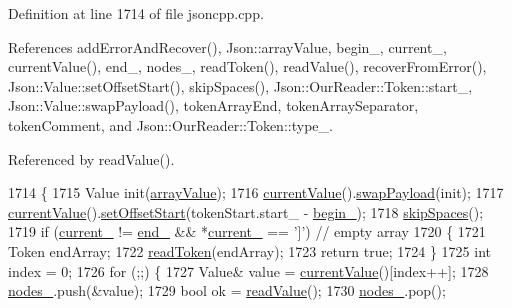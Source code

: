 Definition at line 1714 of file jsoncpp.\+cpp.



References add\+Error\+And\+Recover(), Json\+::array\+Value, begin\+\_\+, current\+\_\+, current\+Value(), end\+\_\+, nodes\+\_\+, read\+Token(), read\+Value(), recover\+From\+Error(), Json\+::\+Value\+::set\+Offset\+Start(), skip\+Spaces(), Json\+::\+Our\+Reader\+::\+Token\+::start\+\_\+, Json\+::\+Value\+::swap\+Payload(), token\+Array\+End, token\+Array\+Separator, token\+Comment, and Json\+::\+Our\+Reader\+::\+Token\+::type\+\_\+.



Referenced by read\+Value().


\begin{DoxyCode}
1714                                            \{
1715   Value init(\hyperlink{namespace_json_a7d654b75c16a57007925868e38212b4eadc8f264f36b55b063c78126b335415f4}{arrayValue});
1716   \hyperlink{class_json_1_1_our_reader_a2acd5b1d53e7d7e17c21ff8e96edc09d}{currentValue}().\hyperlink{class_json_1_1_value_a5263476047f20e2fc6de470e4de34fe5}{swapPayload}(init);
1717   \hyperlink{class_json_1_1_our_reader_a2acd5b1d53e7d7e17c21ff8e96edc09d}{currentValue}().\hyperlink{class_json_1_1_value_a92e32ea0f4f8a15853a3cf0beac9feb9}{setOffsetStart}(tokenStart.start\_ - 
      \hyperlink{class_json_1_1_our_reader_a9bda9d72335d52cd06e65f9eca3f70f5}{begin\_});
1718   \hyperlink{class_json_1_1_our_reader_a6fbc6d58a4505e5ccadf330b57b17ca5}{skipSpaces}();
1719   \textcolor{keywordflow}{if} (\hyperlink{class_json_1_1_our_reader_a5211fbbba94be80a22dd2317c621efcc}{current\_} != \hyperlink{class_json_1_1_our_reader_ab1f69b0260c27a0d2d65dc56e42c8f9d}{end\_} && *\hyperlink{class_json_1_1_our_reader_a5211fbbba94be80a22dd2317c621efcc}{current\_} == \textcolor{charliteral}{']'}) \textcolor{comment}{// empty array}
1720   \{
1721     Token endArray;
1722     \hyperlink{class_json_1_1_our_reader_a0d1e66da47fe2e85f5033c59326dfdc3}{readToken}(endArray);
1723     \textcolor{keywordflow}{return} \textcolor{keyword}{true};
1724   \}
1725   \textcolor{keywordtype}{int} index = 0;
1726   \textcolor{keywordflow}{for} (;;) \{
1727     Value& value = \hyperlink{class_json_1_1_our_reader_a2acd5b1d53e7d7e17c21ff8e96edc09d}{currentValue}()[index++];
1728     \hyperlink{class_json_1_1_our_reader_a19cc4e8c5d17ee6822f752e9a36f4ce3}{nodes\_}.push(&value);
1729     \textcolor{keywordtype}{bool} ok = \hyperlink{class_json_1_1_our_reader_a1765d9670d191c89a57a22ea5591d35f}{readValue}();
1730     \hyperlink{class_json_1_1_our_reader_a19cc4e8c5d17ee6822f752e9a36f4ce3}{nodes\_}.pop();

\end{DoxyCode}
